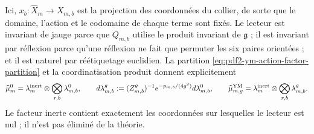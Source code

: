 Ici, $x_b:\widehat X_m\to X_{m,b}$ est la projection des coordonnées du collier, de sorte que le domaine, l'action et le codomaine de chaque terme sont fixés. Le lecteur est invariant de jauge parce que $Q_{m,b}$ utilise le produit invariant de $\mathfrak g$ ; il est invariant par réflexion parce qu'une réflexion ne fait que permuter les six paires orientées ; et il est naturel par réétiquetage euclidien. La partition \eqref{eq:pdf2-ym-action-factor-partition} et la coordinatisation produit donnent explicitement
\begin{equation}\label{eq:pdf2-ym-action-factor-measures}
 \widehat\mu_m^0=\lambda_m^{\rm inert}\otimes
   \bigotimes_{r,b}\lambda_{m,b}^0,
 \qquad
 d\lambda_{m,b}^g
 :=(Z_{m,b}^g)^{-1}e^{-p_{m,b}/(4g^2)}d\lambda_{m,b}^0,
 \qquad
 \widehat\mu_{m,g}^{\rm YM}=\lambda_m^{\rm inert}\otimes
   \bigotimes_{r,b}\lambda_{m,b}^g.
\end{equation}
Le facteur inerte contient exactement les coordonnées sur lesquelles le lecteur est nul ; il n'est pas éliminé de la théorie.

